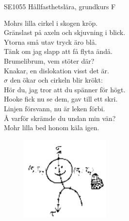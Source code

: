 \documentclass[a6paper, 10pt, twoside]{article}
\begin{document}
\noindent
\begin{center}
\footnotesize SE1055 Hållfasthetslära, grundkurs F\\
\end{center}
\begin{lyrics}
Mohrs lilla cirkel i skogen kröp. \\
Gränslast på axeln och skjuvning i blick. \\
Ytorna små utav tryck äro blå. \\
Tänk om jag slapp att få flyta ändå. 
\vspace{5pt} \\
Brumelibrum, vem stöter där? \\
Knakar, en dislokation visst det är. \\
$\sigma$ den ökar och cirkeln blir krökt: \\
Hör du, jag tror att du spänner för högt. 
\vspace{5pt} \\
Hooke fick nu se dem, gav till ett skri. \\
Linjen försvann, nu är leken förbi. \\
Å varför skrämde du undan min vän? \\
Mohr lilla bed honom käla igen. 
\end{lyrics}

\begin{figure}[!h]
\centering
\includegraphics[width=0.4\textwidth]{Hallfgubbe.png}
\end{figure}
\end{document}
